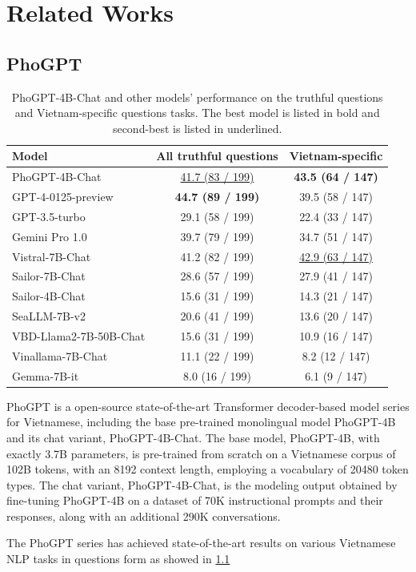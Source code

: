 \chapter{Related Works}

\section{PhoGPT}

\begin{table}[!h]
    \centering
    \begin{tabular}{l|c|c}
    \hline 
    \textbf{Model} & \textbf{All truthful questions} & \textbf{Vietnam-specific} \\
    \hline
    PhoGPT-4B-Chat	& \underline{41.7	(83 / 199)}	& \textbf{43.5	(64 / 147)} \\
    GPT-4-0125-preview		& \textbf{44.7	(89 / 199)}		& 39.5	(58 / 147)  \\
    GPT-3.5-turbo		& 29.1	(58 / 199)		& 22.4	(33 / 147)  \\
    Gemini Pro 1.0		& 39.7	(79 / 199)		& 34.7	(51 / 147)  \\
    Vistral-7B-Chat		& 41.2	(82 / 199)		& \underline{42.9	(63 / 147)}  \\
    Sailor-7B-Chat		& 28.6	(57 / 199)		& 27.9	(41 / 147)  \\
    Sailor-4B-Chat		& 15.6	(31 / 199)		& 14.3	(21 / 147)  \\
    SeaLLM-7B-v2		& 20.6	(41 / 199)		& 13.6	(20 / 147)  \\
    VBD-Llama2-7B-50B-Chat		& 15.6	(31 / 199)		& 10.9	(16 / 147)  \\
    Vinallama-7B-Chat		& 11.1	(22 / 199)		& 8.2	(12 / 147)  \\
    Gemma-7B-it		& 8.0	(16 / 199)		& 6.1	(9 / 147)  \\
    \hline 
    \end{tabular}
    \caption{PhoGPT-4B-Chat and other models' performance on the truthful questions and Vietnam-specific questions tasks. The best model is listed in bold and second-best is listed in underlined.}
    \label{table:comparision}
\end{table}

PhoGPT \cite{nguyen2024phogptgenerativepretrainingvietnamese} is a open-source state-of-the-art Transformer decoder-based model series for Vietnamese, including the base pre-trained monolingual model PhoGPT-4B and its chat variant, PhoGPT-4B-Chat. The base model, PhoGPT-4B, with exactly 3.7B parameters, is pre-trained from scratch on a Vietnamese corpus of 102B tokens, with an 8192 context length, employing a vocabulary of 20480 token types. The chat variant, PhoGPT-4B-Chat, is the modeling output obtained by fine-tuning PhoGPT-4B on a dataset of 70K instructional prompts and their responses, along with an additional 290K conversations. \par
The PhoGPT series has achieved state-of-the-art results on various Vietnamese NLP tasks in questions form as showed in \ref{table:comparision}


